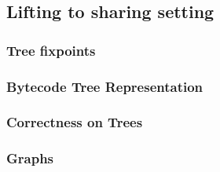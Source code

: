    \subsection{Lifting to sharing setting}
        \begin{frame}
            \frametitle{Tree fixpoints}

        \end{frame}

        \begin{frame}
            \frametitle{Bytecode Tree Representation}
        \end{frame}
                
        \begin{frame}
            \frametitle{Correctness on Trees}
        \end{frame}

        \begin{frame}
            \frametitle{Graphs}
            
        \end{frame}
         
